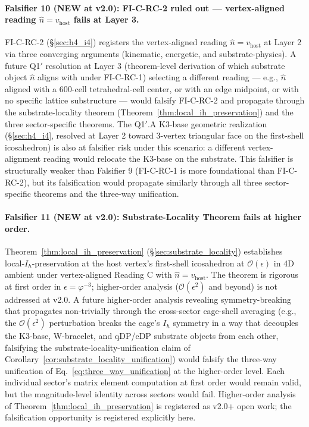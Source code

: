\documentclass[11pt,letterpaper]{article}
\newcommand{\phig}{\varphi}
\begin{document}
\paragraph{Falsifier 10 (NEW at v2.0): FI-C-RC-2 ruled out --- vertex-aligned reading $\hat{n} = v_{\text{host}}$ fails at Layer 3.}
FI-C-RC-2 (\S\ref{sec:h4_i4}) registers the vertex-aligned reading $\hat{n} = v_{\text{host}}$ at Layer 2 via three converging arguments (kinematic, energetic, and substrate-physics). A future Q1$'$ resolution at Layer 3 (theorem-level derivation of which substrate object $\hat{n}$ aligns with under FI-C-RC-1) selecting a different reading --- e.g., $\hat{n}$ aligned with a 600-cell tetrahedral-cell center, or with an edge midpoint, or with no specific lattice substructure --- would falsify FI-C-RC-2 and propagate through the substrate-locality theorem (Theorem~\ref{thm:local_ih_preservation}) and the three sector-specific theorems. The Q1$'$.A K3-base geometric realization (\S\ref{sec:h4_i4}, resolved at Layer 2 toward 3-vertex triangular face on the first-shell icosahedron) is also at falsifier risk under this scenario: a different vertex-alignment reading would relocate the K3-base on the substrate. This falsifier is structurally weaker than Falsifier 9 (FI-C-RC-1 is more foundational than FI-C-RC-2), but its falsification would propagate similarly through all three sector-specific theorems and the three-way unification.

\paragraph{Falsifier 11 (NEW at v2.0): Substrate-Locality Theorem fails at higher order.}
Theorem~\ref{thm:local_ih_preservation} (\S\ref{sec:substrate_locality}) establishes local-$I_h$-preservation at the host vertex's first-shell icosahedron at $\mathcal{O}(\epsilon)$ in 4D ambient under vertex-aligned Reading C with $\hat{n} = v_{\text{host}}$. The theorem is rigorous at first order in $\epsilon = \phig^{-3}$; higher-order analysis ($\mathcal{O}(\epsilon^2)$ and beyond) is not addressed at v2.0. A future higher-order analysis revealing symmetry-breaking that propagates non-trivially through the cross-sector cage-shell averaging (e.g., the $\mathcal{O}(\epsilon^2)$ perturbation breaks the cage's $I_h$ symmetry in a way that decouples the K3-base, W-bracelet, and qDP/eDP substrate objects from each other, falsifying the substrate-locality-unification claim of Corollary~\ref{cor:substrate_locality_unification}) would falsify the three-way unification of Eq.~\eqref{eq:three_way_unification} at the higher-order level. Each individual sector's matrix element computation at first order would remain valid, but the magnitude-level identity across sectors would fail. Higher-order analysis of Theorem~\ref{thm:local_ih_preservation} is registered as v2.0+ open work; the falsification opportunity is registered explicitly here.
\end{document}
